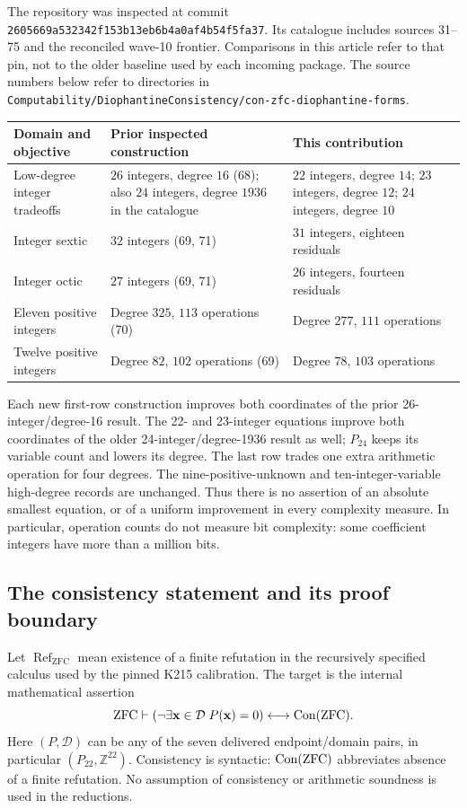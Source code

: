 \documentclass[11pt]{article}
\theoremstyle{remark}\newtheorem{remark}[theorem]{Remark}
\newcommand{\Z}{\mathbb Z}\newcommand{\N}{\mathbb N}\newcommand{\Q}{\mathbb Q}
\newcommand{\ZFC}{\mathrm{ZFC}}
\begin{document}
The repository was inspected at commit
\texttt{2605669a532342f153b13eb6b4a0af4b54f5fa37}. Its catalogue includes
sources 31--75 and the reconciled wave-10 frontier. Comparisons in this
article refer to that pin, not to the older baseline used by each incoming
package. The source numbers below refer to directories in
\texttt{Computability/DiophantineConsistency/con-zfc-diophantine-forms}.

\begin{center}
\begin{tabular}{@{}p{3.2cm}p{5.1cm}p{6.3cm}@{}}
\toprule
Domain and objective & Prior inspected construction & This contribution\\
\midrule
Low-degree integer tradeoffs & $26$ integers, degree $16$ (68); also $24$ integers, degree $1936$ in the catalogue & $22$ integers, degree $14$; $23$ integers, degree $12$; $24$ integers, degree $10$\\
Integer sextic & $32$ integers (69, 71) & $31$ integers, eighteen residuals\\
Integer octic & $27$ integers (69, 71) & $26$ integers, fourteen residuals\\
Eleven positive integers & Degree $325$, $113$ operations (70) & Degree $277$, $111$ operations\\
Twelve positive integers & Degree $82$, $102$ operations (69) & Degree $78$, $103$ operations\\
\bottomrule
\end{tabular}
\end{center}

Each new first-row construction improves both coordinates of the prior
26-integer/degree-16 result. The 22- and 23-integer equations improve both
coordinates of the older 24-integer/degree-1936 result as well; $P_{24}$
keeps its variable count and lowers its degree. The last row trades one extra arithmetic operation
for four degrees. The nine-positive-unknown and ten-integer-variable
high-degree records are unchanged. Thus there is no assertion of an
absolute smallest equation, or of a uniform improvement in every complexity
measure. In particular, operation counts do not measure bit complexity:
some coefficient integers have more than a million bits.

\subsection{The consistency statement and its proof boundary}

Let $\operatorname{Ref}_{\ZFC}$ mean existence of a finite refutation in
the recursively specified calculus used by the pinned K215 calibration.
The target is the internal mathematical assertion
\begin{equation}
 \ZFC\vdash
 \left(\neg\exists\mathbf x\in\mathcal D\;P(\mathbf x)=0\right)
 \longleftrightarrow\Con(\ZFC).
 \label{eq:target}
\end{equation}
Here $(P,\mathcal D)$ can be any of the seven delivered endpoint/domain
pairs, in particular $(P_{22},\Z^{22})$. Consistency is syntactic:
$\Con(\ZFC)$ abbreviates absence of a
finite refutation. No assumption of consistency or arithmetic soundness
is used in the reductions.
\end{document}
